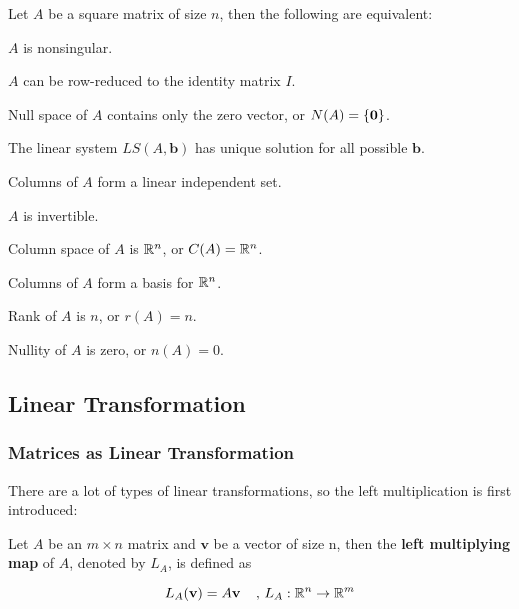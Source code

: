 \documentclass[a4paper,12pt]{article}
\begin{document}
\begin{pst}
  Let $A$ be a square matrix of size $n$, then the following are equivalent:

  \begin{alist}
    \item $A$ is nonsingular.
    \item $A$ can be row-reduced to the identity matrix $I$.
    \item Null space of $A$ contains only the zero vector, or $N(A)=\left\{ \mathbf{0}\right\}$.
    \item The linear system $LS(A,\mathbf{b})$ has unique solution for all possible $\mathbf{b}$.
    \item Columns of $A$ form a linear independent set.
    \item $A$ is invertible.
    \item Column space of $A$ is $\mathbb{R}^{n}$, or $C(A)=\mathbb{R}^{n}$.
    \item Columns of $A$ form a basis for $\mathbb{R}^{n}$.
    \item Rank of $A$ is $n$, or $r(A)=n$.
    \item Nullity of $A$ is zero, or $n(A)=0$.
  \end{alist}
\end{pst}

\subsection{Linear Transformation}
\subsubsection{Matrices as Linear Transformation}
There are a lot of types of linear transformations, so the left multiplication is first introduced:\n

\begin{dft}
  Let $A$ be an $m\times n$ matrix and $\mathbf{v}$ be a vector of size n, then the \textbf{left multiplying map} of $A$, denoted by $L_{A}$, is defined as

  $$L_{A}(\mathbf{v})=A\mathbf{v}\;\;\;\;\text{, }L_{A}:\mathbb{R}^{n}\to\mathbb{R}^{m}$$
\end{dft}\n
\end{document}
